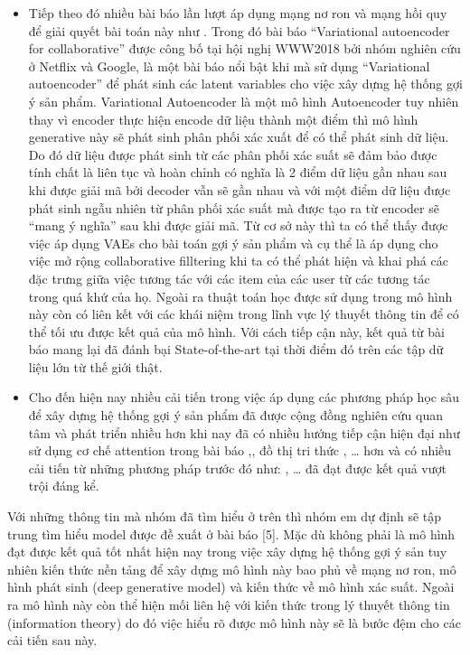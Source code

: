 \documentclass{article}[14pt]
\begin{document}
{\begin{itemize}
 \item 		Tiếp theo đó nhiều bài báo lần lượt áp dụng mạng nơ ron và mạng 
hồi quy để giải quyết bài toán này như . 
 Trong đó bài báo “Variational autoencoder for collaborative” được công bố 
tại hội nghị WWW2018\cite{mvae}  bởi nhóm nghiên cứu ở Netflix và Google, 
là một bài báo nổi bật khi mà sử dụng “Variational autoencoder” để phát 
sinh các latent variables cho việc xây dựng hệ thống gợi ý sản phẩm.
 Variational Autoencoder là một mô hình Autoencoder tuy nhiên thay vì 
encoder thực hiện encode dữ liệu thành một điểm thì mô hình generative này 
sẽ phát sinh phân phối xác xuất để có thể phát sinh dữ liệu. 
 Do đó dữ liệu được phát sinh từ các phân phối xác suất sẽ đảm bảo được tính 
chất là liên tục và hoàn chỉnh có nghĩa là 2 điểm dữ liệu gần nhau sau khi 
được giải mã bởi decoder vẫn sẽ gần nhau và với một điểm dữ liệu được phát 
sinh ngẫu nhiên từ phân phối xác suất mà được tạo ra từ encoder sẽ “mang ý 
nghĩa” sau khi được giải mã.
 Từ cơ sở này thì ta có thể thấy được việc áp dụng VAEs cho bài toán gợi ý 
sản phẩm và cụ thể là áp dụng cho việc mở rộng collaborative filltering khi 
ta có thể phát hiện và khai phá các đặc trưng giữa việc tương tác với các 
item của các user từ các tương tác trong quá khứ của họ. 
 Ngoài ra thuật toán học được sử dụng trong mô hình này còn có liên kết với 
các khái niệm trong lĩnh vực lý thuyết thông tin để có thể tối ưu được kết 
quả của mô hình. 
 Với cách tiếp cận này, kết quả từ bài báo mang lại đã đánh bại 
State-of-the-art tại thời điểm đó trên các tập dữ liệu lớn từ thế giới 
thật.  
 \item	Cho đến hiện nay nhiều cải tiến trong việc áp dụng các phương pháp 
học sâu để xây dựng hệ thống gợi ý sản phẩm đã được cộng đồng nghiên cứu 
quan tâm và phát triển nhiều hơn khi nay đã có nhiều hướng tiếp cận hiện 
đại như sử dụng cơ chế attention trong bài báo \cite{bert4rec} ,, đồ thị 
tri thức \cite{kl4rec}, …  hơn và có nhiều cải tiến từ những phương pháp 
trước đó như:\cite{vamp} , … đã đạt được kết quả vượt trội đáng kể. 
\end{itemize}
    Với những thông tin mà nhóm đã tìm hiểu ở trên thì nhóm em dự định sẽ 
tập trung tìm hiểu model được đề xuất ở bài báo [5].
    Mặc dù không phải là mô hình đạt được kết quả tốt nhất hiện nay trong 
việc xây dựng hệ thống gợi ý sản tuy nhiên kiến thức nền tảng để xây 
dựng mô hình này bao phủ về mạng nơ ron, mô hình phát sinh (deep 
generative model) và kiến thức về mô hình xác suất. 
    Ngoài ra mô hình này còn thể hiện mối liên hệ với kiến thức trong lý 
thuyết thông tin (information theory) do đó việc hiểu rõ được mô hình 
này sẽ là bước đệm cho các cải tiến sau này. 
    
}
\end{document}
